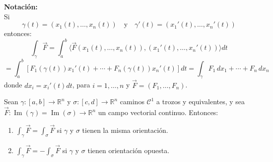 \textbf{Notación:}\\
Si
\[
    \gamma(t) = (x_1(t), \ldots, x_n(t)) \quad \text{y} \quad \gamma'(t) = (x_1'(t), \ldots, x_n'(t))
\]
entonces:
\[
    \int_\gamma \vec{F} = \int_a^b \langle \vec{F}(x_1(t), \ldots, x_n(t)), (x_1'(t), \ldots, x_n'(t)) \rangle dt
\]
\[
    = \int_a^b \left[ F_1(\gamma(t)) x_1'(t) + \cdots + F_n(\gamma(t)) x_n'(t) \right] dt = \int_\gamma F_1 \, dx_1 + \cdots + F_n \, dx_n
\]
donde $dx_i = x_i'(t) dt$, para $i = 1, \ldots, n$ y $\vec{F} = (F_1, \ldots,
    F_n)$.\\

\begin{teorema}
    Sean $\gamma : [a, b] \to \mathbb{R}^n$ y $\sigma : [c, d] \to \mathbb{R}^n$ caminos $\mathcal{C}^1$ a trozos y equivalentes, y sea $\vec{F} : \operatorname{Im}(\gamma) = \operatorname{Im}(\sigma) \to \mathbb{R}^n$ un campo vectorial continuo. Entonces:
    \vspace{-0.5em}
    \begin{enumerate}
        \item $\displaystyle \int_\gamma \vec{F} = \int_\sigma \vec{F}$ \quad si $\gamma$ y $\sigma$ tienen la misma orientación.
        \item $\displaystyle \int_\gamma \vec{F} = - \int_\sigma \vec{F}$ \quad si $\gamma$ y $\sigma$ tienen orientación opuesta.
    \end{enumerate}
\end{teorema}

